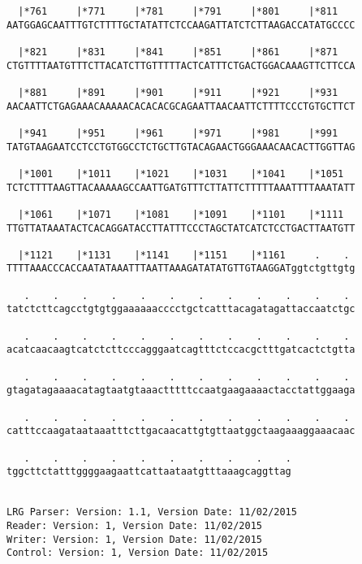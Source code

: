\documentclass{article}
\begin{document}
\begin{Verbatim}
  |*761     |*771     |*781     |*791     |*801     |*811   
AATGGAGCAATTTGTCTTTTGCTATATTCTCCAAGATTATCTCTTAAGACCATATGCCCC
                                                            
  |*821     |*831     |*841     |*851     |*861     |*871   
CTGTTTTAATGTTTCTTACATCTTGTTTTTACTCATTTCTGACTGGACAAAGTTCTTCCA
                                                            
  |*881     |*891     |*901     |*911     |*921     |*931   
AACAATTCTGAGAAACAAAAACACACACGCAGAATTAACAATTCTTTTCCCTGTGCTTCT
                                                            
  |*941     |*951     |*961     |*971     |*981     |*991   
TATGTAAGAATCCTCCTGTGGCCTCTGCTTGTACAGAACTGGGAAACAACACTTGGTTAG
                                                            
  |*1001    |*1011    |*1021    |*1031    |*1041    |*1051  
TCTCTTTTAAGTTACAAAAAGCCAATTGATGTTTCTTATTCTTTTTAAATTTTAAATATT
                                                            
  |*1061    |*1071    |*1081    |*1091    |*1101    |*1111  
TTGTTATAAATACTCACAGGATACCTTATTTCCCTAGCTATCATCTCCTGACTTAATGTT
                                                            
  |*1121    |*1131    |*1141    |*1151    |*1161     .    . 
TTTTAAACCCACCAATATAAATTTAATTAAAGATATATGTTGTAAGGATggtctgttgtg
                                                            
   .    .    .    .    .    .    .    .    .    .    .    . 
tatctcttcagcctgtgtggaaaaaacccctgctcatttacagatagattaccaatctgc
                                                            
   .    .    .    .    .    .    .    .    .    .    .    . 
acatcaacaagtcatctcttcccagggaatcagtttctccacgctttgatcactctgtta
                                                            
   .    .    .    .    .    .    .    .    .    .    .    . 
gtagatagaaaacatagtaatgtaaactttttccaatgaagaaaactacctattggaaga
                                                            
   .    .    .    .    .    .    .    .    .    .    .    . 
catttccaagataataaatttcttgacaacattgtgttaatggctaagaaaggaaacaac
                                                            
   .    .    .    .    .    .    .    .    .    .
tggcttctatttggggaagaattcattaataatgtttaaagcaggttag
                                                 
                                                 
LRG Parser: Version: 1.1, Version Date: 11/02/2015
Reader: Version: 1, Version Date: 11/02/2015
Writer: Version: 1, Version Date: 11/02/2015
Control: Version: 1, Version Date: 11/02/2015
\end{Verbatim}
\end{document}
